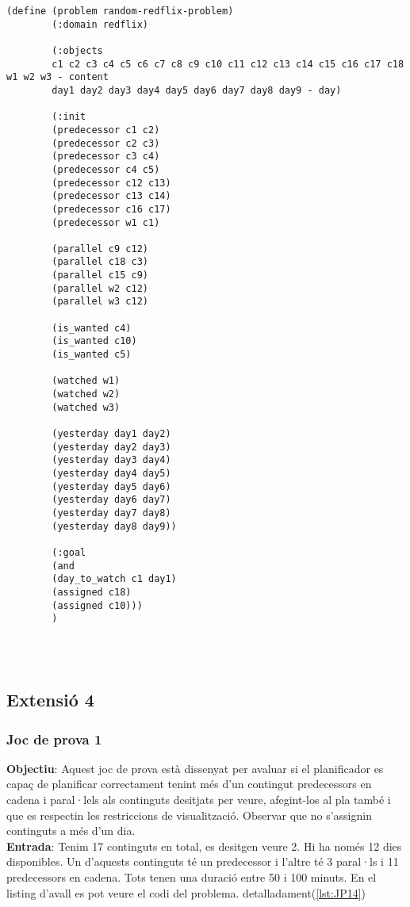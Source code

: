 \documentclass[a4paper]{article}
\begin{document}
	\begin{lstlisting}[language=PDDL, caption={Joc de Prova Random - Extensió 3}, label={lst:JPR3}]                  
		(define (problem random-redflix-problem)
		(:domain redflix)
		
		(:objects
		c1 c2 c3 c4 c5 c6 c7 c8 c9 c10 c11 c12 c13 c14 c15 c16 c17 c18 w1 w2 w3 - content
		day1 day2 day3 day4 day5 day6 day7 day8 day9 - day)
		
		(:init
		(predecessor c1 c2)
		(predecessor c2 c3)
		(predecessor c3 c4)
		(predecessor c4 c5)
		(predecessor c12 c13)
		(predecessor c13 c14)
		(predecessor c16 c17)
		(predecessor w1 c1)
		
		(parallel c9 c12)
		(parallel c18 c3)
		(parallel c15 c9)
		(parallel w2 c12)
		(parallel w3 c12)
		
		(is_wanted c4)
		(is_wanted c10)
		(is_wanted c5)
		
		(watched w1)
		(watched w2)
		(watched w3)
		
		(yesterday day1 day2)
		(yesterday day2 day3)
		(yesterday day3 day4)
		(yesterday day4 day5)
		(yesterday day5 day6)
		(yesterday day6 day7)
		(yesterday day7 day8)
		(yesterday day8 day9))
		
		(:goal
		(and
		(day_to_watch c1 day1)
		(assigned c18)
		(assigned c10)))
		)
		
		
		
	\end{lstlisting}
	
	\subsection{Extensió 4}
	\subsubsection*{Joc de prova 1}
	
	\noindent \textbf{Objectiu}: Aquest joc de prova està dissenyat per avaluar si el planificador es capaç de planificar correctament tenint més d'un contingut predecessors en cadena i paral·lels als continguts desitjats per veure, afegint-los al pla també i que es respectin les restriccions de visualització. Observar que no s'assignin continguts a més d'un dia.  \\
	
	\noindent \textbf{Entrada}: Tenim 17 continguts en total, es desitgen veure 2. Hi ha només 12 dies disponibles. Un d'aquests continguts té un predecessor i l'altre té 3 paral·ls i 11 predecessors en cadena. Tots tenen una duració entre 50 i 100 minuts. En el listing d'avall es pot veure el codi del problema.  detalladament(\ref{lst:JP14}) \\
	
\end{document}
